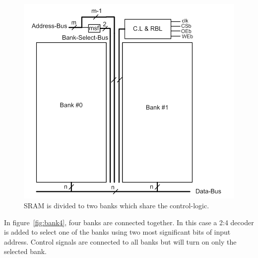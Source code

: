 \begin{figure}[h!]
\centering
\includegraphics[scale=.9]{./figs/bank2.pdf}
\caption{SRAM is divided to two banks which share the control-logic.}
\label{fig:bank2}
\end{figure}

In figure~\ref{fig:bank4}, four banks are connected together. In this case a 2:4 decoder is added to select one of the banks using two 
most significant bits of input address. Control signals are connected to all banks but will turn on only the selected bank.


